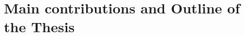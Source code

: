 



\section{Main contributions and Outline of the Thesis}
\label{section:ch1-main_contributions_and_outline_of_the_thesis}


%

